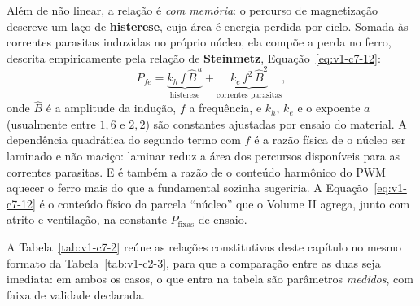 \documentclass[12pt,a4paper]{article}
\numberwithin{equation}{section}
\numberwithin{table}{section}
\numberwithin{figure}{section}
\begin{document}
Além de não linear, a relação é \emph{com memória}: o percurso de magnetização
descreve um laço de \textbf{histerese}, cuja área é energia perdida por ciclo.
Somada às correntes parasitas induzidas no próprio núcleo, ela compõe a perda
no ferro, descrita empiricamente pela relação de \textbf{Steinmetz},
Equação~\eqref{eq:v1-c7-12}:
\begin{equation}\label{eq:v1-c7-12}
P_{fe} = \underbrace{k_h\,f\,\hat{B}^{\,a}}_{\text{histerese}} +
\underbrace{k_e\,f^{2}\,\hat{B}^{2}}_{\text{correntes parasitas}},
\end{equation}
onde $\hat{B}$ é a amplitude da indução, $f$ a frequência, e $k_h$, $k_e$ e o
expoente $a$ (usualmente entre $1{,}6$ e $2{,}2$) são constantes ajustadas por
ensaio do material. A dependência quadrática do segundo termo com $f$ é a razão
física de o núcleo ser laminado e não maciço: laminar reduz a área dos
percursos disponíveis para as correntes parasitas. E é também a razão de o
conteúdo harmônico do PWM aquecer o ferro mais do que a fundamental sozinha
sugeriria. A Equação~\eqref{eq:v1-c7-12} é o conteúdo físico da parcela
``núcleo'' que o Volume II agrega, junto com atrito e ventilação, na constante
$P_{\text{fixas}}$ de ensaio.

A Tabela~\ref{tab:v1-c7-2} reúne as relações constitutivas deste capítulo no
mesmo formato da Tabela~\ref{tab:v1-c2-3}, para que a comparação entre as duas
seja imediata: em ambos os casos, o que entra na tabela são parâmetros
\emph{medidos}, com faixa de validade declarada.

\begin{table}[H]
\centering
\caption[Relações constitutivas eletromagnéticas]{Relações constitutivas
eletromagnéticas, parâmetros e premissas --- contraparte da
Tabela~\ref{tab:v1-c2-3}.}
\label{tab:v1-c7-2}
\small
{}
\end{table}
\end{document}
